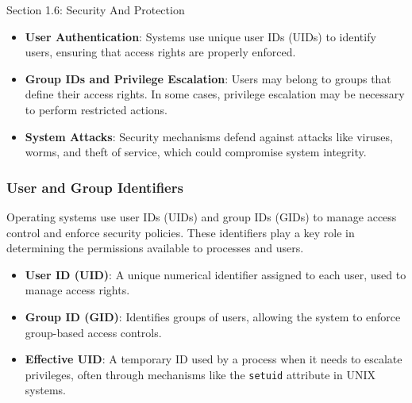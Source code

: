 \begin{notes}{Section 1.6: Security And Protection}
    \begin{highlight}
    
    \begin{itemize}
        \item \textbf{User Authentication}: Systems use unique user IDs (UIDs) to identify users, ensuring that access rights are properly enforced.
        \item \textbf{Group IDs and Privilege Escalation}: Users may belong to groups that define their access rights. In some cases, privilege escalation may be necessary to perform restricted actions.
        \item \textbf{System Attacks}: Security mechanisms defend against attacks like viruses, worms, and theft of service, which could compromise system integrity.
    \end{itemize}
    
    \end{highlight}
    
    \subsubsection*{User and Group Identifiers}
    
    Operating systems use user IDs (UIDs) and group IDs (GIDs) to manage access control and enforce security policies. These identifiers play a key role in determining the permissions available to 
    processes and users.
    
    \begin{highlight}
    
    \begin{itemize}
        \item \textbf{User ID (UID)}: A unique numerical identifier assigned to each user, used to manage access rights.
        \item \textbf{Group ID (GID)}: Identifies groups of users, allowing the system to enforce group-based access controls.
        \item \textbf{Effective UID}: A temporary ID used by a process when it needs to escalate privileges, often through mechanisms like the \texttt{setuid} attribute in UNIX systems.
    \end{itemize}
    
    \end{highlight}
    
    \begin{highlight}
    

\end{highlight}
\end{notes}
